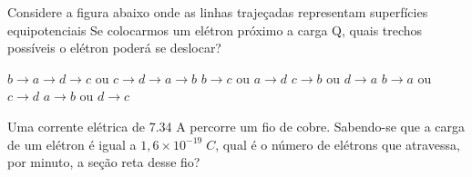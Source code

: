 \documentclass[12pt, addpoints]{exam}
\begin{document}
    \begin{questions}
\begin{multicols*}{2}
\question Considere a figura abaixo onde as linhas trajeçadas representam superfícies equipotenciais Se colocarmos um elétron próximo a carga Q, quais trechos possíveis o elétron poderá se deslocar?
        
        \begin{center}
            \begin{minipage}[c]{0.5\linewidth}
            \end{minipage}
        \end{center}
        
        

\begin{choices}
\choice $b\rightarrow a\rightarrow d\rightarrow c$ ou $c\rightarrow d\rightarrow a\rightarrow b$ 
\choice $b\rightarrow c$ ou $a\rightarrow d$ 
\choice $c\rightarrow b$ ou $d\rightarrow a$ 
\choice $b\rightarrow a$ ou $c\rightarrow d$ 
\choice $a\rightarrow b$ ou $d\rightarrow c$ 
\end{choices}
\question Uma corrente elétrica de    7.34 A percorre um ﬁo de cobre. Sabendo-se que a carga de um elétron é igual a $1,6\times 10^{-19}\;C$, qual é o número de elétrons que atravessa, por minuto, a seção reta desse ﬁo?


\end{multicols*}
\end{questions}
\end{document}
